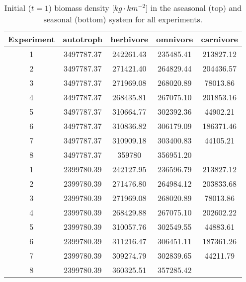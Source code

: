 \begin{table}[ht]
\centering
\caption{Initial ($t = 1$) biomass density [$kg\cdot km^{-2}$] in the aseasonal (top) and seasonal (bottom) system for all experiments.} 
\label{tab:app:initialBMD}
\begin{tabular*}{\textwidth}{@{\extracolsep{\fill} }ccccc}
  \toprule
\textbf{Experiment} & \textbf{autotroph} & \textbf{herbivore} & \textbf{omnivore} & \textbf{carnivore} \\ 
  \midrule
1 & 3497787.37 & 242261.43 & 235485.41 & 213827.12 \\ 
  2 & 3497787.37 & 271421.40 & 264829.44 & 204436.57 \\ 
  3 & 3497787.37 & 271969.08 & 268020.89 & 78013.86 \\ 
  4 & 3497787.37 & 268435.81 & 267075.10 & 201853.16 \\ 
  5 & 3497787.37 & 310664.77 & 302392.36 & 44902.21 \\ 
  6 & 3497787.37 & 310836.82 & 306179.09 & 186371.46 \\ 
  7 & 3497787.37 & 310909.18 & 303400.83 & 44105.21 \\ 
  8 & 3497787.37 & 359780 & 356951.20 &  \\ 
  \cmidrule(lr){2-5}
   1 & 2399780.39 & 242127.95 & 236596.79 & 213827.12 \\ 
  2 & 2399780.39 & 271476.80 & 264984.12 & 203833.68 \\ 
  3 & 2399780.39 & 271969.08 & 268020.89 & 78013.86 \\ 
  4 & 2399780.39 & 268429.88 & 267075.10 & 202602.22 \\ 
  5 & 2399780.39 & 310057.76 & 302549.55 & 44883.61 \\ 
  6 & 2399780.39 & 311216.47 & 306451.11 & 187361.26 \\ 
  7 & 2399780.39 & 309274.79 & 302839.65 & 44211.79 \\ 
  8 & 2399780.39 & 360325.51 & 357285.42 &  \\ 
   \bottomrule
\end{tabular*}
\end{table}
